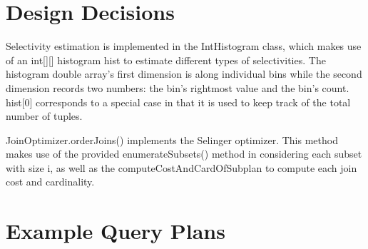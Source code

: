 \documentclass[paper=a4, fontsize=11pt]{scrartcl} %
\numberwithin{equation}{section} %
\numberwithin{figure}{section} %
\numberwithin{table}{section} %
\begin{document}
\section{Design Decisions}


Selectivity estimation is implemented in the IntHistogram class, which makes use of an int[][] histogram hist to estimate different types of selectivities. The histogram double array's first dimension is along individual bins while the second dimension records two numbers: the bin's rightmost value and the bin's count. hist[0] corresponds to a special case in that it is used to keep track of the total number of tuples.





JoinOptimizer.orderJoins() implements the Selinger optimizer. This method makes use of the provided enumerateSubsets() method in considering each subset with size i, as well as the computeCostAndCardOfSubplan to compute each join cost and cardinality.

\section{Example Query Plans}
\end{document}
